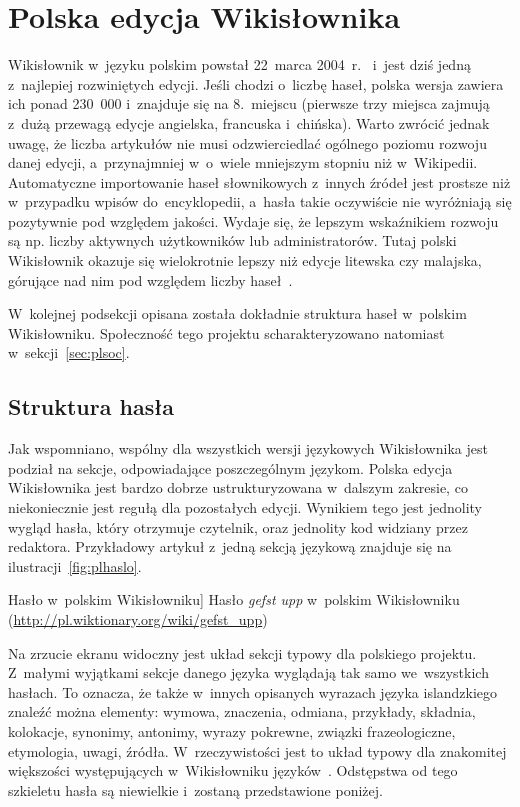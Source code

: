 \section{Polska edycja Wikisłownika}
\label{sec:plwikt}
Wikisłownik w~języku polskim powstał 22~marca 2004~r.~\cite{wikt:home} i~jest dziś jedną z~najlepiej rozwiniętych edycji. Jeśli chodzi o~liczbę haseł, polska wersja zawiera ich ponad 230~000 i~znajduje się na 8.~miejscu (pierwsze trzy miejsca zajmują z~dużą przewagą edycje angielska, francuska i~chińska). Warto zwrócić jednak uwagę, że liczba artykułów nie musi odzwierciedlać ogólnego poziomu rozwoju danej edycji, a~przynajmniej w~o~wiele mniejszym stopniu niż w~Wikipedii. Automatyczne importowanie haseł słownikowych z~innych źródeł jest prostsze niż w~przypadku wpisów do~encyklopedii, a~hasła takie oczywiście nie wyróżniają się pozytywnie pod względem jakości. Wydaje się, że lepszym wskaźnikiem rozwoju są np. liczby aktywnych użytkowników lub administratorów. Tutaj polski Wikisłownik okazuje się wielokrotnie lepszy niż edycje litewska czy malajska, górujące nad nim pod względem liczby haseł~\cite{wikt:list}.

W~kolejnej podsekcji opisana została dokładnie struktura haseł w~polskim Wikisłowniku. Społeczność tego projektu scharakteryzowano natomiast w~sekcji~\ref{sec:plsoc}.

\subsection{Struktura hasła}
Jak wspomniano, wspólny dla wszystkich wersji językowych Wikisłownika jest podział na sekcje, odpowiadające poszczególnym językom. Polska edycja Wikisłownika jest bardzo dobrze ustrukturyzowana w~dalszym zakresie, co niekoniecznie jest regułą dla pozostałych edycji. Wynikiem tego jest jednolity wygląd hasła, który otrzymuje czytelnik, oraz jednolity kod widziany przez redaktora. Przykładowy artykuł z~jedną sekcją językową znajduje się na ilustracji~\ref{fig:plhaslo}.

\begin{illustration}
	\caption
		[Hasło w~polskim Wikisłowniku]
		{Hasło \emph{gefst upp} w~polskim Wikisłowniku (\protect\url{http://pl.wiktionary.org/wiki/gefst_upp})}
	\label{fig:plhaslo}
\end{illustration}

Na zrzucie ekranu widoczny jest układ sekcji typowy dla polskiego projektu. Z~małymi wyjątkami sekcje danego języka wyglądają tak samo we~wszystkich hasłach. To oznacza, że także w~innych opisanych wyrazach języka islandzkiego znaleźć można elementy: wymowa, znaczenia, odmiana, przykłady, składnia, kolokacje, synonimy, antonimy, wyrazy pokrewne, związki frazeologiczne, etymologia, uwagi, źródła. W~rzeczywistości jest to układ typowy dla znakomitej większości występujących w~Wikisłowniku języków~\cite{wikt:zasady}. Odstępstwa od tego szkieletu hasła są niewielkie i~zostaną przedstawione poniżej.

